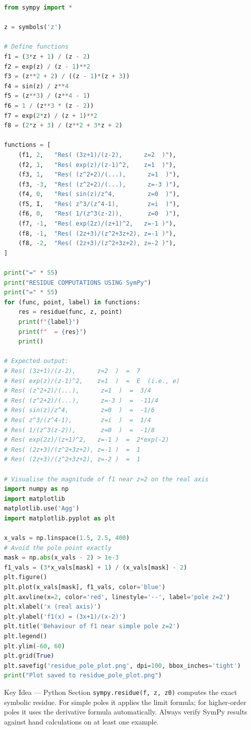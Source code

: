 \documentclass[12pt,a4paper]{article}
\begin{document}
\begin{lstlisting}[language=Python]
from sympy import *

z = symbols('z')

# Define functions
f1 = (3*z + 1) / (z - 2)
f2 = exp(z) / (z - 1)**2
f3 = (z**2 + 2) / ((z - 1)*(z + 3))
f4 = sin(z) / z**4
f5 = (z**3) / (z**4 - 1)
f6 = 1 / (z**3 * (z - 2))
f7 = exp(2*z) / (z + 1)**2
f8 = (2*z + 3) / (z**2 + 3*z + 2)

functions = [
    (f1, 2,   "Res( (3z+1)/(z-2),      z=2  )"),
    (f2, 1,   "Res( exp(z)/(z-1)^2,    z=1  )"),
    (f3, 1,   "Res( (z^2+2)/(...),      z=1  )"),
    (f3, -3,  "Res( (z^2+2)/(...),      z=-3 )"),
    (f4, 0,   "Res( sin(z)/z^4,         z=0  )"),
    (f5, I,   "Res( z^3/(z^4-1),        z=i  )"),
    (f6, 0,   "Res( 1/(z^3(z-2)),       z=0  )"),
    (f7, -1,  "Res( exp(2z)/(z+1)^2,   z=-1 )"),
    (f8, -1,  "Res( (2z+3)/(z^2+3z+2), z=-1 )"),
    (f8, -2,  "Res( (2z+3)/(z^2+3z+2), z=-2 )"),
]

print("=" * 55)
print("RESIDUE COMPUTATIONS USING SymPy")
print("=" * 55)
for (func, point, label) in functions:
    res = residue(func, z, point)
    print(f"{label}")
    print(f"  = {res}")
    print()

# Expected output:
# Res( (3z+1)/(z-2),      z=2  )  =  7
# Res( exp(z)/(z-1)^2,    z=1  )  =  E  (i.e., e)
# Res( (z^2+2)/(...),      z=1  )  =  3/4
# Res( (z^2+2)/(...),      z=-3 )  =  -11/4
# Res( sin(z)/z^4,         z=0  )  =  -1/6
# Res( z^3/(z^4-1),        z=i  )  =  1/4
# Res( 1/(z^3(z-2)),       z=0  )  =  -1/8
# Res( exp(2z)/(z+1)^2,   z=-1 )  =  2*exp(-2)
# Res( (2z+3)/(z^2+3z+2), z=-1 )  =  1
# Res( (2z+3)/(z^2+3z+2), z=-2 )  =  1

# Visualise the magnitude of f1 near z=2 on the real axis
import numpy as np
import matplotlib
matplotlib.use('Agg')
import matplotlib.pyplot as plt

x_vals = np.linspace(1.5, 2.5, 400)
# Avoid the pole point exactly
mask = np.abs(x_vals - 2) > 1e-3
f1_vals = (3*x_vals[mask] + 1) / (x_vals[mask] - 2)
plt.figure()
plt.plot(x_vals[mask], f1_vals, color='blue')
plt.axvline(x=2, color='red', linestyle='--', label='pole z=2')
plt.xlabel('x (real axis)')
plt.ylabel('f1(x) = (3x+1)/(x-2)')
plt.title('Behaviour of f1 near simple pole z=2')
plt.legend()
plt.ylim(-60, 60)
plt.grid(True)
plt.savefig('residue_pole_plot.png', dpi=100, bbox_inches='tight')
print("Plot saved to residue_pole_plot.png")
\end{lstlisting}

\begin{learnbox}{Key Idea --- Python Section}
\texttt{sympy.residue(f, z, z0)} computes the exact symbolic residue.
For simple poles it applies the limit formula; for higher-order poles it uses the derivative
formula automatically.  Always verify SymPy results against hand calculations on at least
one example.
\end{learnbox}
\end{document}
